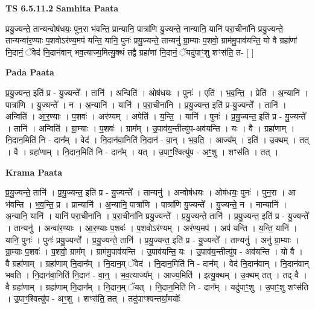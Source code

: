 \documentclass[17pt]{extarticle}
\begin{document}
\textbf{TS 6.5.11.2 } \newline
\textbf{Samhita Paata} \newline

प्रयु॒ज्यन्ते॒ तान्यन्वोष॑धयः॒ पुन॒रा भ॑वन्ति॒ प्रान्यानि॒ पात्रा॑णि यु॒ज्यन्ते॒ नान्यानि॒ यानि॑ परा॒चीना॑नि प्रयु॒ज्यन्ते॒ तान्यन्वा॑र॒ण्याः प॒शवोऽर॑ण्य॒मप॑ यन्ति॒ यानि॒ पुनः॑ प्रयु॒ज्यन्ते॒ तान्यनु॑ ग्रा॒म्याः प॒शवो॒ ग्राम॑मु॒पाव॑यन्ति॒ यो वै ग्रहा॑णां नि॒दानं॒ ॅवेद॑ नि॒दान॑वान् भव॒त्याज्य॒मित्यु॒क्थं तद्वै ग्रहा॑णां नि॒दानं॒ ॅयदु॑पाꣳ॒॒शु शꣳस॑ति॒ त- [  ] \newline

\textbf{Pada Paata} \newline

प्र॒यु॒ज्यन्त॒ इति॑ प्र - यु॒ज्यन्ते᳚ । तानि॑ । अन्विति॑ । ओष॑धयः । पुनः॑ । एति॑ । भ॒व॒न्ति॒ । प्रेति॑ । अ॒न्यानि॑ । पात्रा॑णि । यु॒ज्यन्ते᳚ । न । अ॒न्यानि॑ । यानि॑ । प॒रा॒चीना॑नि । प्र॒यु॒ज्यन्त॒ इति॑ प्र-यु॒ज्यन्ते᳚ । तानि॑ । अन्विति॑ । आ॒र॒ण्याः । प॒शवः॑ । अर॑ण्यम् । अपेति॑ । य॒न्ति॒ । यानि॑ । पुनः॑ । प्र॒यु॒ज्यन्त॒ इति॑ प्र - यु॒ज्यन्ते᳚ । तानि॑ । अन्विति॑ । ग्रा॒म्याः । प॒शवः॑ । ग्राम᳚म् । उ॒पाव॑य॒न्तीत्यु॑प-अव॑यन्ति । यः । वै । ग्रहा॑णाम् । नि॒दान॒मिति॑ नि - दान᳚म् । वेद॑ । नि॒दान॑वा॒निति॑ नि॒दान॑ - वा॒न् । भ॒व॒ति॒ । आज्य᳚म् । इति॑ । उ॒क्थम् । तत् । वै । ग्रहा॑णाम् । नि॒दान॒मिति॑ नि - दान᳚म् । यत् । उ॒पाꣳ॒॒श्वित्यु॑प - अꣳ॒॒शु । शꣳस॑ति । तत् ।  \newline


\textbf{Krama Paata} \newline

प्र॒यु॒ज्यन्ते॒ तानि॑ । प्र॒यु॒ज्यन्त॒ इति॑ प्र - यु॒ज्यन्ते᳚ । तान्यनु॑ । अन्वोष॑धयः । ओष॑धयः॒ पुनः॑ । पुन॒रा । आ भ॑वन्ति । भ॒व॒न्ति॒ प्र । प्रान्यानि॑ । अ॒न्यानि॒ पात्रा॑णि । पात्रा॑णि यु॒ज्यन्ते᳚ । यु॒ज्यन्ते॒ न । नान्यानि॑ । अ॒न्यानि॒ यानि॑ । यानि॑ परा॒चीना॑नि । प॒रा॒चीना॑नि प्रयु॒ज्यन्ते᳚ । प्र॒यु॒ज्यन्ते॒ तानि॑ । प्र॒यु॒ज्यन्त॒ इति॑ प्र - यु॒ज्यन्ते᳚ । तान्यनु॑ । अन्वा॑र॒ण्याः । आ॒र॒ण्याः प॒शवः॑ । प॒शवोऽर॑ण्यम् । अर॑ण्य॒मप॑ । अप॑ यन्ति । य॒न्ति॒ यानि॑ । यानि॒ पुनः॑ । पुनः॑ प्रयु॒ज्यन्ते᳚ । प्र॒यु॒ज्यन्ते॒ तानि॑ । प्र॒यु॒ज्यन्त॒ इति॑ प्र - यु॒ज्यन्ते᳚ । तान्यनु॑ । अनु॑ ग्रा॒म्याः । ग्रा॒म्याः प॒शवः॑ । प॒शवो॒ ग्राम᳚म् । ग्राम॑मु॒पाव॑यन्ति । उ॒पाव॑यन्ति॒ यः । उ॒पाव॑य॒न्तीत्यु॑प - अव॑यन्ति । यो वै । वै ग्रहा॑णाम् । ग्रहा॑णाम् नि॒दान᳚म् । नि॒दान॒म् ॅवेद॑ । नि॒दान॒मिति॑ नि - दान᳚म् । वेद॑ नि॒दान॑वान् । नि॒दान॑वान् भवति । नि॒दान॑वा॒निति॑ नि॒दान॑ - वा॒न्॒ । भ॒व॒त्याज्य᳚म् । आज्य॒मिति॑ । इत्यु॒क्थम् । उ॒क्थम् तत् । तद् वै । वै ग्रहा॑णाम् । ग्रहा॑णाम् नि॒दान᳚म् । नि॒दान॒म् ॅयत् । नि॒दान॒मिति॑ नि - दान᳚म् । यदु॑पाꣳ॒॒शु । उ॒पाꣳ॒॒शु शꣳस॑ति । उ॒पाꣳ॒॒श्वित्यु॑प - अꣳ॒॒शु । शꣳस॑ति॒ तत् । तदु॑पाꣳश्वन्तर्या॒मयोः᳚ \newline
\end{document}
